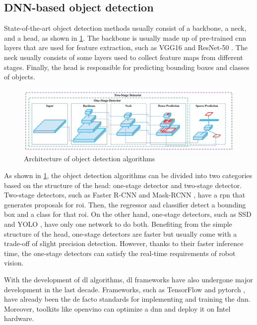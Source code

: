 \subsection{DNN-based object detection}

State-of-the-art object detection methods usually consist of a backbone, a neck, and a head, as shown in \cref{fig:object_detector}. The backbone is usually made up of pre-trained \gls{cnn} layers that are used for feature extraction, such as VGG16 \cite{Simonyan2015} and ResNet-50 \cite{He2016}. The neck usually consists of some layers used to collect feature maps from different stages. Finally, the head is responsible for predicting bounding boxes and classes of objects. 

\begin{figure}
    \centering
    \includegraphics[width=\linewidth]{figures/background/object_detector.png}
    \caption[Architecture of object detection algorithms]{Architecture of object detection algorithms \cite{Bochkovskiy2020}}
    \label{fig:object_detector}
\end{figure}

As shown in \cref{fig:object_detector}, the object detection algorithms can be divided into two categories based on the structure of the head: one-stage detector and two-stage detector. Two-stage detectors, such as Faster R-CNN \cite{Ren2015} and Mask-RCNN \cite{He2017}, have a \gls{rpn} that generates proposals for \gls{roi}. Then, the regressor and classifier detect a bounding box and a class for that \gls{roi}. On the other hand, one-stage detectors, such as SSD \cite{Liu2016} and YOLO \cite{Redmon2016}, have only one network to do both. Benefiting from the simple structure of the head, one-stage detectors are faster but usually come with a trade-off of slight precision detection. However, thanks to their faster inference time, the one-stage detectors can satisfy the real-time requirements of robot vision.

With the development of \gls{dl} algorithms, \gls{dl} frameworks have also undergone major development in the last decade. Frameworks, such as TensorFlow \cite{MartinAbadi2015} and \gls{pytorch} \cite{Paszke2019}, have already been the de facto standards for implementing and training the \gls{dnn}. Moreover, toolkits like \gls{openvino} \cite{Demidovskij2019} can optimize a \gls{dnn} and deploy it on Intel hardware.

